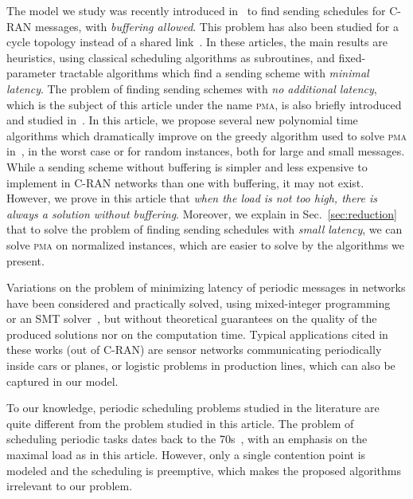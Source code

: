 \documentclass[a4paper,UKenglish,cleveref, autoref, thm-restate]{lipics-v2019}
\newcommand\pma{\textsc{pma}\xspace}
\begin{document}
The model we study was recently introduced in~\cite{barth2018deterministic,bartharxiv2018deterministic} to find sending schedules for C-RAN messages, with \emph{buffering allowed}. This problem has also been studied for a cycle topology instead of a shared link~\cite{Guir1905:Deterministic}. In these articles, the main results are heuristics, using classical scheduling algorithms as subroutines, and fixed-parameter tractable algorithms which find a sending scheme with \emph{minimal latency}. The problem of finding sending schemes with \emph{no additional latency}, which is the subject of this article under the name \pma, is also briefly introduced and studied in~\cite{bartharxiv2018deterministic}.
In this article, we propose several new polynomial time algorithms which dramatically improve on the greedy algorithm used to solve \pma in~\cite{bartharxiv2018deterministic}, in the worst case or for random instances, both for large and small messages. 
While a sending scheme without buffering is simpler and less expensive to implement in C-RAN networks than one with buffering, it may not exist. However, we prove in this article that \emph{when the load is not too high, there is always a solution without buffering}. Moreover, we explain in Sec.~\ref{sec:reduction} that to solve the problem of finding sending schedules with \emph{small latency}, we can solve \pma on normalized instances, which are easier to solve by the algorithms we present.

 Variations on the problem of minimizing latency of periodic messages in networks have been considered and practically solved, using mixed-integer programming~\cite{nayak2017incremental,steiner2018traffic} or an SMT solver~\cite{dos2019tsnsched}, but without theoretical guarantees on the quality of the produced solutions nor on the computation time. Typical applications cited in these works (out of C-RAN) are sensor networks communicating periodically inside cars or planes, or logistic problems in production lines, which can also be captured in our model.

 To our knowledge, periodic scheduling problems studied in the literature are quite different from the problem studied in this article. The problem of scheduling periodic tasks dates back to the 70s~\cite{liu1973scheduling}, with an emphasis on the maximal load as in this article. However, only a single contention point is modeled and the scheduling is preemptive, which makes the proposed algorithms irrelevant to our problem.
\end{document}
